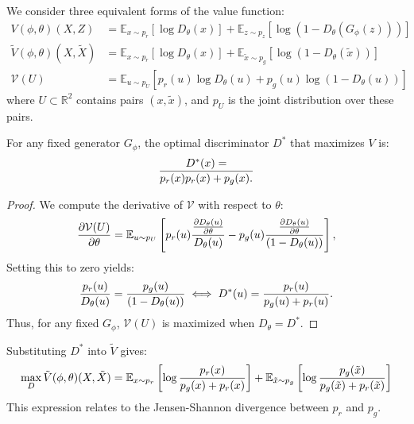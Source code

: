 We consider three equivalent forms of the value function:
\begin{align}
	V(\phi, \theta)(X, Z)                 & = \mathbb{E}_{x \sim p_r}[\log D_\theta(x)] + \mathbb{E}_{z \sim p_z}[\log(1 - D_\theta(G_\phi(z)))]         \\
	\tilde{V}(\phi, \theta)(X, \tilde{X}) & = \mathbb{E}_{x \sim p_r}[\log D_\theta(x)] + \mathbb{E}_{\tilde{x} \sim p_g}[\log(1 - D_\theta(\tilde{x}))] \\
	\mathcal{V}(U)                        & = \mathbb{E}_{u \sim p_U} [p_r(u) \log D_\theta(u) + p_g(u) \log(1 - D_\theta(u))]
\end{align}
where $U \subset \mathbb{R}^2$ contains pairs $(x, \tilde{x})$, and $p_U$ is the joint distribution over these pairs.

\begin{theorem}%
	\label{theorem:minimax}
	For any fixed generator $G_\phi$, the optimal discriminator $D^*$ that maximizes $V$ is:
	\begin{align}
		D^*(x) = \over{p_r(x)}{p_r(x) + p_g(x)}.
	\end{align}
\end{theorem}
\begin{proof}
	We compute the derivative of $\mathcal{V}$ with respect to $\theta$:
	\begin{align}
		\label{eq:derivatives}
		{\partial \mathcal{V}(U) \over \partial \theta} = \mathbb{E}_{u \sim p_U}\left[ p_r(u) { {\partial D_\theta(u) \over \partial \theta} \over D_\theta(u)} - p_g(u) {{\partial D_\theta(u) \over \partial \theta} \over (1 - D_\theta(u))}\right],
	\end{align}
	Setting this to zero yields:
	\begin{align}
		\label{eq:20}
		{p_r(u) \over D_\theta(u)} = {p_g(u) \over (1 - D_\theta(u))} \iff D^*(u) = {p_r(u) \over p_g(u) + p_r(u)}.
	\end{align}
	Thus, for any fixed $G_\phi$, $\mathcal{V}(U)$ is maximized when $D_\theta = D^*$.
\end{proof}

Substituting $D^*$ into $\tilde{V}$ gives:
\begin{align}
	\label{eq:sum-of-two-kl-divergences}
	\max_D \tilde{V}(\phi, \theta)(X, \tilde{X}) = \mathbb{E}_{x \sim p_r}\left[\log{p_r(x) \over p_g(x) + p_r(x)}\right] + \mathbb{E}_{\tilde{x} \sim p_g}\left[\log{p_g(\tilde{x}) \over p_g(\tilde{x}) + p_r(\tilde{x})} \right]
\end{align}
This expression relates to the Jensen-Shannon divergence between $p_r$ and $p_g$.

